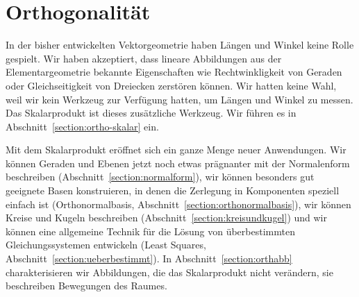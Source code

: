 %
%
%
\chapter{Orthogonalität\label{chapter:orthogonalitaet}}
\rhead{}
In der bisher entwickelten Vektorgeometrie haben Längen und Winkel keine 
Rolle gespielt.
Wir haben akzeptiert, dass lineare Abbildungen aus der Elementargeometrie
bekannte Eigenschaften wie Rechtwinkligkeit von Geraden oder Gleichseitigkeit
von Dreiecken zerstören können.
Wir hatten keine Wahl, weil wir kein Werkzeug zur Verfügung hatten, 
um Längen und Winkel zu messen.
Das Skalarprodukt ist dieses zusätzliche Werkzeug.
Wir führen es in Abschnitt~\ref{section:ortho-skalar} ein.

Mit dem Skalarprodukt eröffnet sich ein ganze Menge neuer Anwendungen.
Wir können Geraden und Ebenen jetzt noch etwas prägnanter mit
der Normalenform beschreiben (Abschnitt~\ref{section:normalform}),
wir können besonders gut geeignete Basen konstruieren, in denen die
Zerlegung in Komponenten speziell einfach ist
(Orthonormalbasis, Abschnitt~\ref{section:orthonormalbasis}),
wir können Kreise und Kugeln
beschreiben (Abschnitt~\ref{section:kreisundkugel}) und wir können eine
allgemeine Technik für die Lösung von überbestimmten Gleichungssystemen
entwickeln (Least Squares, Abschnitt~\ref{section:ueberbestimmt}).
In Abschnitt~\ref{section:orthabb} charakterisieren wir Abbildungen,
die das Skalarprodukt nicht verändern, sie beschreiben Bewegungen
des Raumes.

%







